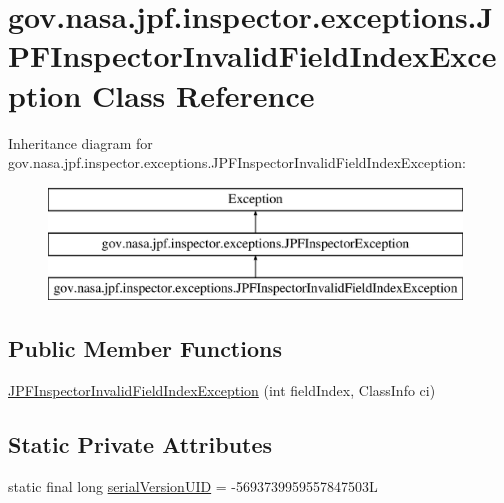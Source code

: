 \hypertarget{classgov_1_1nasa_1_1jpf_1_1inspector_1_1exceptions_1_1_j_p_f_inspector_invalid_field_index_exception}{}\section{gov.\+nasa.\+jpf.\+inspector.\+exceptions.\+J\+P\+F\+Inspector\+Invalid\+Field\+Index\+Exception Class Reference}
\label{classgov_1_1nasa_1_1jpf_1_1inspector_1_1exceptions_1_1_j_p_f_inspector_invalid_field_index_exception}
Inheritance diagram for gov.\+nasa.\+jpf.\+inspector.\+exceptions.\+J\+P\+F\+Inspector\+Invalid\+Field\+Index\+Exception\+:\begin{figure}[H]
\begin{center}
\leavevmode
\includegraphics[height=3.000000cm]{classgov_1_1nasa_1_1jpf_1_1inspector_1_1exceptions_1_1_j_p_f_inspector_invalid_field_index_exception}
\end{center}
\end{figure}
\subsection*{Public Member Functions}
\begin{DoxyCompactItemize}
\item 
\hyperlink{classgov_1_1nasa_1_1jpf_1_1inspector_1_1exceptions_1_1_j_p_f_inspector_invalid_field_index_exception_af81f9f8c3d1a37391d0aa5e37e4415c3}{J\+P\+F\+Inspector\+Invalid\+Field\+Index\+Exception} (int field\+Index, Class\+Info ci)
\end{DoxyCompactItemize}
\subsection*{Static Private Attributes}
\begin{DoxyCompactItemize}
\item 
static final long \hyperlink{classgov_1_1nasa_1_1jpf_1_1inspector_1_1exceptions_1_1_j_p_f_inspector_invalid_field_index_exception_a3ef456967be4a4b894365e4ac5472698}{serial\+Version\+U\+ID} = -\/5693739959557847503L
\end{DoxyCompactItemize}


